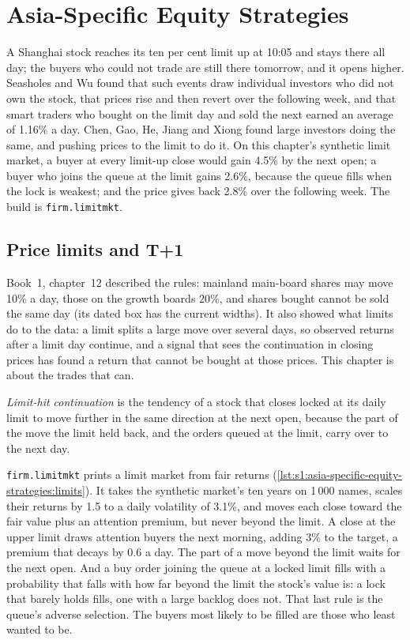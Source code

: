 \chapter{Asia-Specific Equity Strategies}\label{ch:s1:asia-specific-equity-strategies}

A Shanghai stock reaches its ten per cent limit up at 10:05 and stays there all day; the buyers who could not trade are still there tomorrow, and it
opens higher. Seasholes and Wu found that such events draw individual investors who did not own the stock, that prices rise and then revert over the
following week, and that smart traders who bought on the limit day and sold the next earned an average of 1.16\% a day. Chen, Gao, He, Jiang and Xiong
found large investors doing the same, and pushing prices to the limit to do it. On this chapter's synthetic limit market, a buyer at every limit-up
close would gain 4.5\% by the next open; a buyer who joins the queue at the limit gains 2.6\%, because the queue fills when the lock is weakest; and
the price gives back 2.8\% over the following week. The build is \texttt{firm.limitmkt}.

\section{Price limits and T+1}

Book~1, chapter~12 described the rules: mainland main-board shares may move 10\% a day, those on the growth boards 20\%, and shares bought cannot be
sold the same day (its dated box has the current widths). It also showed what limits do to the data: a limit splits a large move over several days, so
observed returns after a limit day continue, and a signal that sees the continuation in closing prices has found a return that cannot be bought at
those prices. This chapter is about the trades that can.

\begin{definition}\label{def:s1:asia-specific-equity-strategies:continuation}
\emph{Limit-hit continuation} is the tendency of a stock that closes locked at its daily limit to move further in the
same direction at the next open, because the part of the move the limit held back, and the orders queued at the limit, carry over to the next
day.
\end{definition}

\texttt{firm.limitmkt} prints a limit market from fair returns (\cref{lst:s1:asia-specific-equity-strategies:limits}). It takes the synthetic
market's ten years on 1\,000 names, scales their returns by 1.5 to a daily volatility of 3.1\%, and moves each close toward the fair value plus an
attention premium, but never beyond the limit. A close at the upper limit draws attention buyers the next morning, adding 3\% to the target, a premium
that decays by 0.6 a day. The part of a move beyond the limit waits for the next open. And a buy order joining the queue at a locked limit fills
with a probability that falls with how far beyond the limit the stock's value is: a lock that barely holds fills, one with a large backlog does not.
That last rule is the queue's adverse selection. The buyers most likely to be filled are those who least wanted to be.

